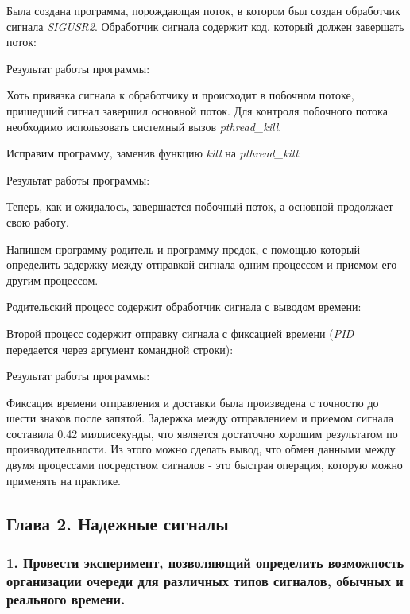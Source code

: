 \documentclass[14pt,a4paper,report]{report}
\begin{document}
Была создана программа, порождающая поток, в котором был создан обработчик сигнала \emph{SIGUSR2}. Обработчик сигнала содержит код, который должен завершать поток:



Результат работы программы:



Хоть привязка сигнала к обработчику и происходит в побочном потоке, пришедший сигнал завершил основной поток. Для контроля побочного потока необходимо использовать системный вызов \emph{pthread\_kill}.

Исправим программу, заменив функцию \emph{kill} на \emph{pthread\_kill}:



Результат работы программы:



Теперь, как и ожидалось, завершается побочный поток, а основной продолжает свою работу.

Напишем программу-родитель и программу-предок, с помощью который определить задержку между отправкой сигнала одним процессом и приемом его другим процессом.

Родительский процесс содержит обработчик сигнала с выводом времени:



Второй процесс содержит отправку сигнала с фиксацией времени (\emph{PID} передается через аргумент командной строки):



Результат работы программы:



Фиксация времени отправления и доставки была произведена с точностю до шести знаков после запятой. Задержка между отправлением и приемом сигнала составила 0.42 миллисекунды, что является достаточно хорошим результатом по производительности. Из этого можно сделать вывод, что обмен данными между двумя процессами посредством сигналов - это быстрая операция, которую можно применять на практике.

\subsection{Глава 2. Надежные сигналы}

\subsubsection{1.  Провести эксперимент, позволяющий определить возможность организации очереди для различных типов сигналов, обычных и реального времени.}
\end{document}
